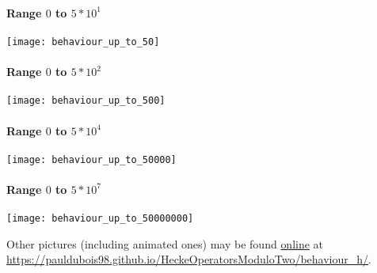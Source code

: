 \paragraph{Range $0$ to $5*10^1$}
\begin{center}
	\texttt{[image: behaviour\_up\_to\_50]}
\end{center}
\paragraph{Range $0$ to $5*10^2$}
\begin{center}
	\texttt{[image: behaviour\_up\_to\_500]}
\end{center}
\newpage
\paragraph{Range $0$ to $5*10^4$}
\begin{center}
	\texttt{[image: behaviour\_up\_to\_50000]}
\end{center}
\paragraph{Range $0$ to $5*10^7$}
\begin{center}
	\texttt{[image: behaviour\_up\_to\_50000000]}
\end{center}
Other pictures (including animated ones) may be found \href{https://pauldubois98.github.io/HeckeOperatorsModuloTwo/behaviour_h/}{online} at \url{https://pauldubois98.github.io/HeckeOperatorsModuloTwo/behaviour_h/}.



\newpage
